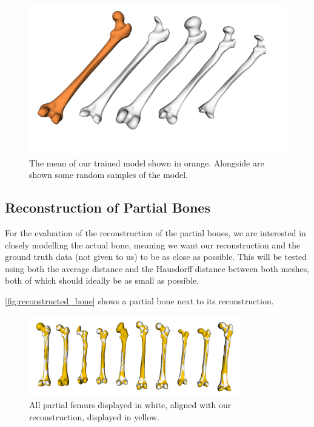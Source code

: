 \begin{figure}
	\centering
  \includegraphics[width=\columnwidth]{./Figures/interpolated_model_samples}
  \caption{
    The mean of our trained model shown in orange.
    Alongside are shown some random samples of the model.}
  \label{fig:trained_model}
\end{figure}


\subsection{Reconstruction of Partial Bones}
\label{subsec:reconresults}
For the evaluation of the reconstruction of the partial bones, we are interested in closely modelling the actual bone, meaning we want our reconstruction and the ground truth data (not given to us) to be as close as possible. 
This will be tested using both the average distance and the Hausdorff distance between both meshes, both of which should ideally be as small as possible.

\autoref{fig:reconstructed_bone} shows a partial bone next to its reconstruction.

\begin{figure}
	\centering
  \includegraphics[width=0.82\textwidth]{./Figures/reconstruction_summary}
  \caption{All partial femurs displayed in white, aligned with our reconstruction, displayed in yellow.}
  \label{fig:reconstructed_bone}
\end{figure}

